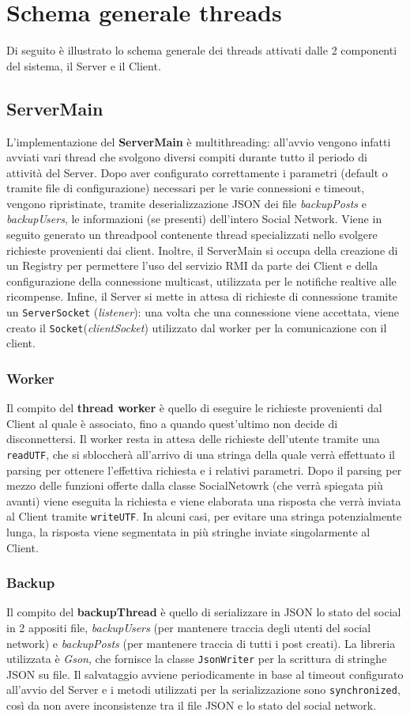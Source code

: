 \documentclass[11pt, a4paper, oneside]{article}
\begin{document}
\section{Schema generale threads}
Di seguito è illustrato lo schema generale dei threads attivati dalle 2 componenti del sistema, il Server e il Client.
\subsection{ServerMain}
L’implementazione del \textbf{ServerMain} è multithreading: all’avvio vengono infatti avviati vari thread che svolgono diversi compiti durante tutto il periodo di attività 
del Server. Dopo aver configurato correttamente i parametri (default o tramite file di configurazione) necessari per le varie connessioni e timeout, vengono ripristinate, tramite
deserializzazione JSON dei file \textit{backupPosts} e \textit{backupUsers}, le informazioni (se presenti) dell’intero Social Network. Viene in seguito generato un threadpool
contenente thread specializzati nello svolgere richieste provenienti dai client. Inoltre, il ServerMain si occupa della creazione di un Registry per permettere l'uso
del servizio RMI da parte dei Client e della configurazione della connessione multicast, utilizzata per le notifiche realtive alle ricompense. 
Infine, il Server si mette in attesa di richieste di connessione tramite un \texttt{ServerSocket} (\textit{listener}): una volta che una connessione viene accettata, 
viene creato il \texttt{Socket}(\textit{clientSocket}) utilizzato dal worker per la comunicazione con il client.
\subsubsection{Worker}
Il compito del \textbf{thread worker} è quello di eseguire le richieste provenienti dal Client al quale è associato, fino a quando quest’ultimo non decide di 
disconnettersi. Il worker resta in attesa delle richieste dell’utente tramite una \texttt{readUTF}, che si sbloccherà all’arrivo di una stringa della quale verrà effettuato 
il parsing per ottenere l’effettiva richiesta e i relativi parametri. Dopo il parsing per mezzo delle funzioni offerte dalla classe SocialNetowrk
(che verrà spiegata più avanti) viene eseguita la richiesta e viene elaborata una risposta che verrà inviata al Client tramite \texttt{writeUTF}. 
In alcuni casi, per evitare una stringa potenzialmente lunga, la risposta viene segmentata in più stringhe inviate singolarmente al Client.
\subsubsection{Backup}
Il compito del \textbf{backupThread} è quello di serializzare in JSON lo stato del social in 2 appositi file, \textit{backupUsers} (per mantenere traccia degli utenti del social network)
e \textit{backupPosts} (per mantenere traccia di tutti i post creati). La libreria utilizzata è \textit{Gson}, che fornisce la classe
\texttt{JsonWriter} per la scrittura di stringhe JSON su file. Il salvataggio avviene periodicamente in base al timeout configurato all'avvio del Server e i metodi
utilizzati per la serializzazione sono \texttt{synchronized}, così da non avere inconsistenze tra il file JSON e lo stato del social network.
\end{document}
